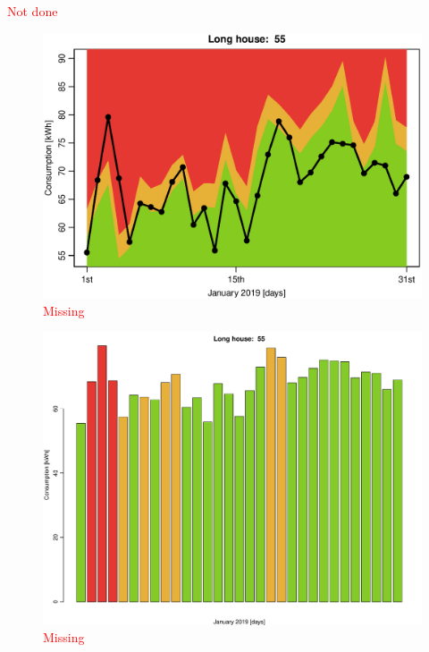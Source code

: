 \noindent 
\noindent \textcolor{red}{Not done}
\begin{figure}
    \centering
    \includegraphics[width=.8\textwidth]{../../../figures/lmpred_col_55L.eps}
    \caption{\textcolor{red}{Missing}}
    \label{fig: lmpred_col_55L}
\end{figure}
\begin{figure}
    \centering
    \includegraphics[width=.8\textwidth]{../../../figures/lmpred_hist_55L.pdf}
    \caption{\textcolor{red}{Missing}}
    \label{fig: lmpred_hist_55L}
\end{figure}

